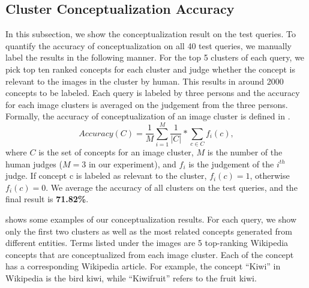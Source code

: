 \subsection{Cluster Conceptualization Accuracy}
In this subsection, we show the conceptualization result on the test
queries. To quantify the accuracy of conceptualization on all 40 test queries,
we manually label the results in the following manner.
For the top 5 clusters of each query,
we pick top ten ranked concepts for each cluster and judge whether the
concept is relevant to the images in the cluster by human.
This results in around 2000 concepts to be labeled.
Each query is labeled by three persons and the accuracy for
each image clusters is averaged on the judgement from the three persons.
Formally, the accuracy of conceptualization
of an image cluster is defined in .
\begin{equation}
Accuracy(C)=\frac{1}{M}\sum_{i=1}^{M}{\frac{1}{|C|}*\sum_{c \in C}{f_{i}(c)}},
\label{equ:conceptaccuracy}
\end{equation}
where $C$ is the set of concepts for an image cluster,
$M$ is the number of the human judges ($M=3$ in
our experiment), and $f_{i}$ is the judgement of the $i^{th}$ judge.
If concept c is labeled as relevant to the cluster, $f_{i}(c)=1$,
otherwise $f_{i}(c)=0$.
We average the accuracy of all clusters on
the test queries, and the final result is {\bf{71.82\%}}.

 shows some examples of our conceptualization
results. For each query, we show only the first two clusters as well as
the most related concepts generated from different entities.
Terms listed under the images are 5 top-ranking Wikipedia concepts that
are conceptualized from each image cluster.
Each of the concept has a corresponding Wikipedia article.
For example, the concept ``Kiwi''
in Wikipedia is the bird kiwi, while ``Kiwifruit'' refers to the fruit kiwi.

